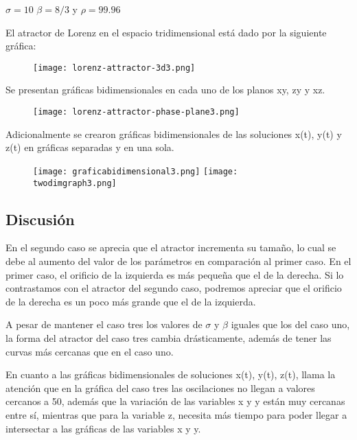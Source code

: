 \documentclass[a4paper]{article}
\begin{document}
\begin{center}
$\sigma=10$ $\beta=8/3$ y $\rho=99.96$
\end{center}

El atractor de Lorenz en el espacio tridimensional está dado por la siguiente gráfica:

\begin{figure}[ht!]
\centering
\texttt{[image: lorenz-attractor-3d3.png]}
\end{figure}

\newpage

Se presentan gráficas bidimensionales en cada uno de los planos xy, zy y xz. 

\begin{figure}[ht!]
\centering
\texttt{[image: lorenz-attractor-phase-plane3.png]}
\end{figure}

Adicionalmente se crearon gráficas bidimensionales de las soluciones x(t), y(t) y z(t) en gráficas separadas y en una sola.

\begin{figure}[ht!]
\centering
\texttt{[image: graficabidimensional3.png]}
\texttt{[image: twodimgraph3.png]}
\end{figure}


\subsection{Discusión}

En el segundo caso se aprecia que el atractor incrementa su tamaño, lo cual se debe al aumento del valor de los parámetros en comparación al primer caso. 
En el primer caso, el orificio de la izquierda es más pequeña que el de la derecha. Si lo contrastamos con el atractor del segundo caso, podremos apreciar que el orificio de la derecha es un poco más grande que el de la izquierda. 

A pesar de mantener el caso tres los valores de $\sigma$ y $\beta$ iguales que los del caso uno, la forma del atractor del caso tres cambia drásticamente, además de tener las curvas más cercanas que en el caso uno. 

En cuanto a las gráficas bidimensionales de soluciones x(t), y(t), z(t), llama la atención que en la gráfica del caso tres las oscilaciones no llegan a valores cercanos a 50, además que la variación de las variables x y y están muy cercanas entre sí, mientras que para la variable z, necesita más tiempo para poder llegar a intersectar a las gráficas de las variables x y y.
\end{document}

